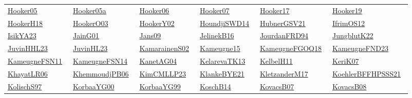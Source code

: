 \begin{longtable}{*{6}{l}}
\href{works/Hooker05.pdf}{Hooker05}~\cite{Hooker05} & \href{works/Hooker05a.pdf}{Hooker05a}~\cite{Hooker05a} & \href{works/Hooker06.pdf}{Hooker06}~\cite{Hooker06} & \href{}{Hooker07}~\cite{Hooker07} & \href{works/Hooker17.pdf}{Hooker17}~\cite{Hooker17} & \href{}{Hooker19}~\cite{Hooker19}\\ 
\href{works/HookerH18.pdf}{HookerH18}~\cite{HookerH18} & \href{}{HookerO03}~\cite{HookerO03} & \href{works/HookerY02.pdf}{HookerY02}~\cite{HookerY02} & \href{works/HoundjiSWD14.pdf}{HoundjiSWD14}~\cite{HoundjiSWD14} & \href{works/HubnerGSV21.pdf}{HubnerGSV21}~\cite{HubnerGSV21} & \href{works/IfrimOS12.pdf}{IfrimOS12}~\cite{IfrimOS12}\\ 
\href{works/IsikYA23.pdf}{IsikYA23}~\cite{IsikYA23} & \href{}{JainG01}~\cite{JainG01} & \href{}{Jans09}~\cite{Jans09} & \href{works/JelinekB16.pdf}{JelinekB16}~\cite{JelinekB16} & \href{}{JourdanFRD94}~\cite{JourdanFRD94} & \href{works/JungblutK22.pdf}{JungblutK22}~\cite{JungblutK22}\\ 
\href{works/JuvinHHL23.pdf}{JuvinHHL23}~\cite{JuvinHHL23} & \href{works/JuvinHL23.pdf}{JuvinHL23}~\cite{JuvinHL23} & \href{works/KamarainenS02.pdf}{KamarainenS02}~\cite{KamarainenS02} & \href{works/Kameugne15.pdf}{Kameugne15}~\cite{Kameugne15} & \href{works/KameugneFGOQ18.pdf}{KameugneFGOQ18}~\cite{KameugneFGOQ18} & \href{works/KameugneFND23.pdf}{KameugneFND23}~\cite{KameugneFND23}\\ 
\href{works/KameugneFSN11.pdf}{KameugneFSN11}~\cite{KameugneFSN11} & \href{works/KameugneFSN14.pdf}{KameugneFSN14}~\cite{KameugneFSN14} & \href{}{KanetAG04}~\cite{KanetAG04} & \href{works/KelarevaTK13.pdf}{KelarevaTK13}~\cite{KelarevaTK13} & \href{works/KelbelH11.pdf}{KelbelH11}~\cite{KelbelH11} & \href{works/KeriK07.pdf}{KeriK07}~\cite{KeriK07}\\ 
\href{works/KhayatLR06.pdf}{KhayatLR06}~\cite{KhayatLR06} & \href{works/KhemmoudjPB06.pdf}{KhemmoudjPB06}~\cite{KhemmoudjPB06} & \href{works/KimCMLLP23.pdf}{KimCMLLP23}~\cite{KimCMLLP23} & \href{works/KlankeBYE21.pdf}{KlankeBYE21}~\cite{KlankeBYE21} & \href{works/KletzanderM17.pdf}{KletzanderM17}~\cite{KletzanderM17} & \href{works/KoehlerBFFHPSSS21.pdf}{KoehlerBFFHPSSS21}~\cite{KoehlerBFFHPSSS21}\\ 
\href{}{KolischS97}~\cite{KolischS97} & \href{works/KorbaaYG00.pdf}{KorbaaYG00}~\cite{KorbaaYG00} & \href{works/KorbaaYG99.pdf}{KorbaaYG99}~\cite{KorbaaYG99} & \href{works/KoschB14.pdf}{KoschB14}~\cite{KoschB14} & \href{works/KovacsB07.pdf}{KovacsB07}~\cite{KovacsB07} & \href{works/KovacsB08.pdf}{KovacsB08}~\cite{KovacsB08}\\ 

\end{longtable}
